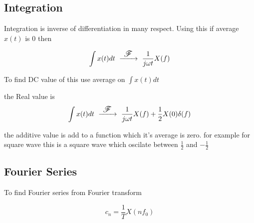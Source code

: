 \newcommand{\FourierTransform}{~ \xrightarrow{ \text{\large $~\mathscr{F}~$}} ~}
\subsection{Integration}
Integration is inverse of differentiation in many respect. Using this if average $x(t)$ is 0 then

\begin{equation}
\int x(t) dt \FourierTransform \frac{1}{j \omega t} X(f)
\end{equation}

To find DC value of this use average on $ \int x(t) dt $

the Real value is 
\begin{equation}
\int x(t) dt \FourierTransform \frac{1}{j \omega t} X(f) + \frac{1}{2}X(0)\delta(f)
\end{equation}

the additive value is add to a function which it's average is zero. for example for square wave this is a square wave which oscilate between $\frac{1}{2}$ and $-\frac{1}{2}$

\subsection{Fourier Series}
To find Fourier series from Fourier transform

\begin{equation}
c_n = \frac{1}{T} X(n f_0)
\end{equation}
~\\

